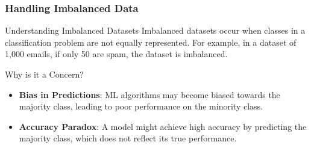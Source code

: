 \documentclass[aspectratio=169]{beamer}
\begin{document}
\begin{frame}[fragile]
    \frametitle{Handling Imbalanced Data}
    \begin{block}{Understanding Imbalanced Datasets}
        Imbalanced datasets occur when classes in a classification problem are not equally represented. For example, in a dataset of 1,000 emails, if only 50 are spam, the dataset is imbalanced.
    \end{block}
    
    \begin{block}{Why is it a Concern?}
        \begin{itemize}
            \item \textbf{Bias in Predictions}: ML algorithms may become biased towards the majority class, leading to poor performance on the minority class.
            \item \textbf{Accuracy Paradox}: A model might achieve high accuracy by predicting the majority class, which does not reflect its true performance.
        \end{itemize}
    \end{block}
\end{frame}
\end{document}
